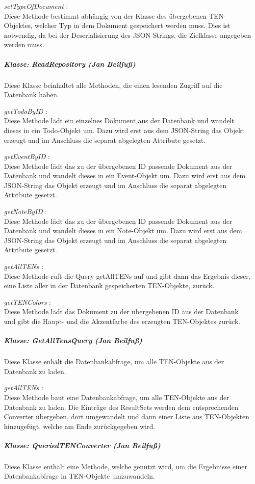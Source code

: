 \textit{ setTypeOfDocument }:\\
Diese Methode bestimmt abhängig von der Klasse des übergebenen TEN-Objektes, welcher Typ in dem Dokument gespeichert werden muss. Dies ist notwendig, da bei der Deserialisierung des JSON-Strings, die Zielklasse angegeben werden muss.

\subparagraph{Klasse: ReadRepository (Jan Beilfuß)}
Diese Klasse beinhaltet alle Methoden, die einen lesenden Zugriff auf die Datenbank haben.

\textit{ getTodoByID }:\\
Diese Methode lädt ein einzelnes Dokument aus der Datenbank und wandelt dieses in ein Todo-Objekt um. Dazu wird erst aus dem JSON-String das Objekt erzeugt und im Anschluss die separat abgelegten Attribute gesetzt.

\textit{ getEventByID }:\\
Diese Methode lädt das zu der übergebenen ID passende Dokument aus der Datenbank und wandelt dieses in ein Event-Objekt um. Dazu wird erst aus dem JSON-String das Objekt erzeugt und im Anschluss die separat abgelegten Attribute gesetzt.

\textit{ getNoteByID }:\\
Diese Methode lädt das zu der übergebenen ID passende Dokument aus der Datenbank und wandelt dieses in ein Note-Objekt um. Dazu wird erst aus dem JSON-String das Objekt erzeugt und im Anschluss die separat abgelegten Attribute gesetzt.

\textit{ getAllTENs }:\\
Diese Methode ruft die Query getAllTENs auf und gibt dann das Ergebnis dieser, eine Liste aller in der Datenbank gespeicherten TEN-Objekte, zurück.

\textit{ getTENColors }:\\
Diese Methode lädt das Dokument zu der übergebenen ID aus der Datenbank und gibt die Haupt- und die Akzentfarbe des erzeugten TEN-Objektes zurück.
\subparagraph{Klasse: GetAllTensQuery (Jan Beilfuß)}
Diese Klasse enhält die Datenbankabfrage, um alle TEN-Objekte aus der Datenbank zu laden.

\textit{ getAllTENs }:\\
Diese Methode baut eine Datenbankabfrage, um alle TEN-Objekte aus der Datenbank zu laden. Die Einträge des ResultSets werden dem entsprechenden Converter übergeben, dort umgewandelt und dann einer Liste aus TEN-Objekten hinzugefügt, welche am Ende zurückgegeben wird.

\subparagraph{Klasse: QueriedTENConverter (Jan Beilfuß)}
Diese Klasse enthält eine Methode, welche genutzt wird, um die Ergebnisse einer Datenbankabfrage in TEN-Objekte umzuwandeln.

